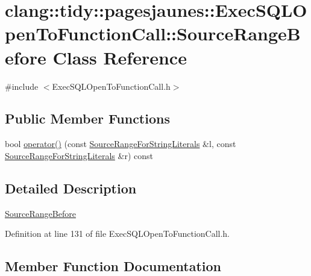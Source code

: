 \hypertarget{classclang_1_1tidy_1_1pagesjaunes_1_1_exec_s_q_l_open_to_function_call_1_1_source_range_before}{}\section{clang\+:\+:tidy\+:\+:pagesjaunes\+:\+:Exec\+S\+Q\+L\+Open\+To\+Function\+Call\+:\+:Source\+Range\+Before Class Reference}
\label{classclang_1_1tidy_1_1pagesjaunes_1_1_exec_s_q_l_open_to_function_call_1_1_source_range_before}


{\ttfamily \#include $<$Exec\+S\+Q\+L\+Open\+To\+Function\+Call.\+h$>$}

\subsection*{Public Member Functions}
\begin{DoxyCompactItemize}
\item 
bool \hyperlink{classclang_1_1tidy_1_1pagesjaunes_1_1_exec_s_q_l_open_to_function_call_1_1_source_range_before_ae54d71bc6f6c204cb9716bfc0c167c86}{operator()} (const \hyperlink{classclang_1_1tidy_1_1pagesjaunes_1_1_exec_s_q_l_open_to_function_call_1_1_source_range_for_string_literals}{Source\+Range\+For\+String\+Literals} \&l, const \hyperlink{classclang_1_1tidy_1_1pagesjaunes_1_1_exec_s_q_l_open_to_function_call_1_1_source_range_for_string_literals}{Source\+Range\+For\+String\+Literals} \&r) const
\end{DoxyCompactItemize}


\subsection{Detailed Description}
\hyperlink{classclang_1_1tidy_1_1pagesjaunes_1_1_exec_s_q_l_open_to_function_call_1_1_source_range_before}{Source\+Range\+Before} 

Definition at line 131 of file Exec\+S\+Q\+L\+Open\+To\+Function\+Call.\+h.



\subsection{Member Function Documentation}
\mbox{\label{classclang_1_1tidy_1_1pagesjaunes_1_1_exec_s_q_l_open_to_function_call_1_1_source_range_before_ae54d71bc6f6c204cb9716bfc0c167c86}} 
